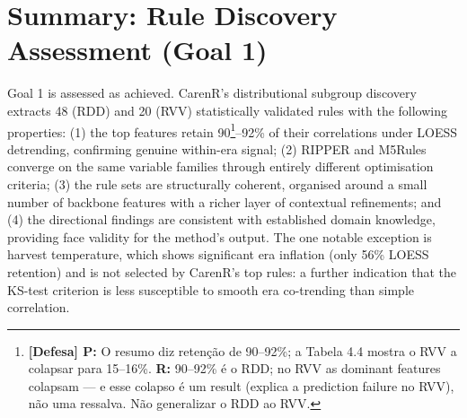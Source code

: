 \section{Summary: Rule Discovery Assessment (Goal 1)}\label{sec:summary_goal_1_assessment}

Goal 1 is assessed as achieved. CarenR's distributional subgroup discovery extracts 48 (RDD) and 20 (RVV) statistically validated rules with the following properties: (1) the top features retain 90\footnote{\textbf{[Defesa] P:} O resumo diz retenção de 90--92\%; a Tabela 4.4 mostra o RVV a colapsar para 15--16\%. \textbf{R:} 90--92\% é o RDD; no RVV as dominant features colapsam --- e esse colapso é um result (explica a prediction failure no RVV), não uma ressalva. Não generalizar o RDD ao RVV.}--92\% of their correlations under LOESS detrending, confirming genuine within-era signal; (2) RIPPER and M5Rules converge on the same variable families through entirely different optimisation criteria; (3) the rule sets are structurally coherent, organised around a small number of backbone features with a richer layer of contextual refinements; and (4) the directional findings are consistent with established domain knowledge, providing face validity for the method's output. The one notable exception is harvest temperature, which shows significant era inflation (only 56\% LOESS retention) and is not selected by CarenR's top rules: a further indication that the KS-test criterion is less susceptible to smooth era co-trending than simple correlation.
